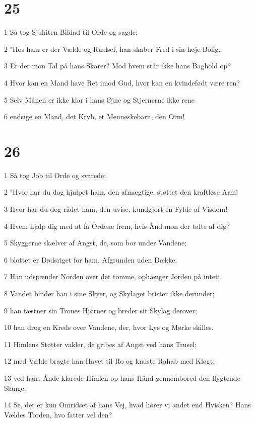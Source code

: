 \chapter{25}

\par 1 Så tog Sjuhiten Bildad til Orde og sagde:
\par 2 "Hos ham er der Vælde og Rædsel, han skaber Fred i sin høje Bolig.
\par 3 Er der mon Tal på hans Skarer? Mod hvem står ikke hans Baghold op?
\par 4 Hvor kan en Mand have Ret imod Gud, hvor kan en kvindefødt være ren?
\par 5 Selv Månen er ikke klar i hans Øjne og Stjernerne ikke rene
\par 6 endsige en Mand, det Kryb, et Menneskebarn, den Orm!

\chapter{26}

\par 1 Så tog Job til Orde og svarede:
\par 2 "Hvor har du dog hjulpet ham, den afmægtige, støttet den kraftløse Arm!
\par 3 Hvor har du dog rådet ham, den uvise, kundgjort en Fylde af Visdom!
\par 4 Hvem hjalp dig med at få Ordene frem, hvis Ånd mon der talte af dig?
\par 5 Skyggerne skælver af Angst, de, som bor under Vandene;
\par 6 blottet er Dødsriget for ham, Afgrunden uden Dække.
\par 7 Han udspænder Norden over det tomme, ophænger Jorden på intet;
\par 8 Vandet binder han i sine Skyer, og Skylaget brister ikke derunder;
\par 9 han fæstner sin Trones Hjørner og breder sit Skylag derover;
\par 10 han drog en Kreds over Vandene, der, hvor Lys og Mørke skilles.
\par 11 Himlens Støtter vakler, de gribes af Angst ved hans Trusel;
\par 12 med Vælde bragte han Havet til Ro og knuste Rahab med Kløgt;
\par 13 ved hans Ånde klarede Himlen op hans Hånd gennembored den flygtende Slange.
\par 14 Se, det er kun Omridset af hans Vej, hvad hører vi andet end Hvisken? Hans Vældes Torden, hvo fatter vel den?

